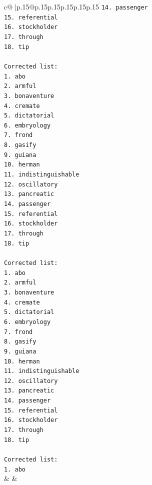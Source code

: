 \documentclass{article}
\begin{document}
{\begin{supertabular}{c@{$\;$}|p{.15\linewidth}@{}p{.15\linewidth}p{.15\linewidth}p{.15\linewidth}p{.15\linewidth}p{.15\linewidth}}
{{{\texttt{14. passenger} \\
\texttt{15. referential} \\
\texttt{16. stockholder} \\
\texttt{17. through} \\
\texttt{18. tip } \\
\\ 
\texttt{Corrected list: } \\
\texttt{1. abo} \\
\texttt{2. armful} \\
\texttt{3. bonaventure} \\
\texttt{4. cremate} \\
\texttt{5. dictatorial} \\
\texttt{6. embryology} \\
\texttt{7. frond} \\
\texttt{8. gasify} \\
\texttt{9. guiana} \\
\texttt{10. herman} \\
\texttt{11. indistinguishable} \\
\texttt{12. oscillatory} \\
\texttt{13. pancreatic} \\
\texttt{14. passenger} \\
\texttt{15. referential} \\
\texttt{16. stockholder} \\
\texttt{17. through} \\
\texttt{18. tip } \\
\\ 
\texttt{Corrected list: } \\
\texttt{1. abo} \\
\texttt{2. armful} \\
\texttt{3. bonaventure} \\
\texttt{4. cremate} \\
\texttt{5. dictatorial} \\
\texttt{6. embryology} \\
\texttt{7. frond} \\
\texttt{8. gasify} \\
\texttt{9. guiana} \\
\texttt{10. herman} \\
\texttt{11. indistinguishable} \\
\texttt{12. oscillatory} \\
\texttt{13. pancreatic} \\
\texttt{14. passenger} \\
\texttt{15. referential} \\
\texttt{16. stockholder} \\
\texttt{17. through} \\
\texttt{18. tip } \\
\\ 
\texttt{Corrected list: } \\
\texttt{1. abo} \\
            }
        }
    }
    & & \\ \\


\end{supertabular}}
\end{document}
